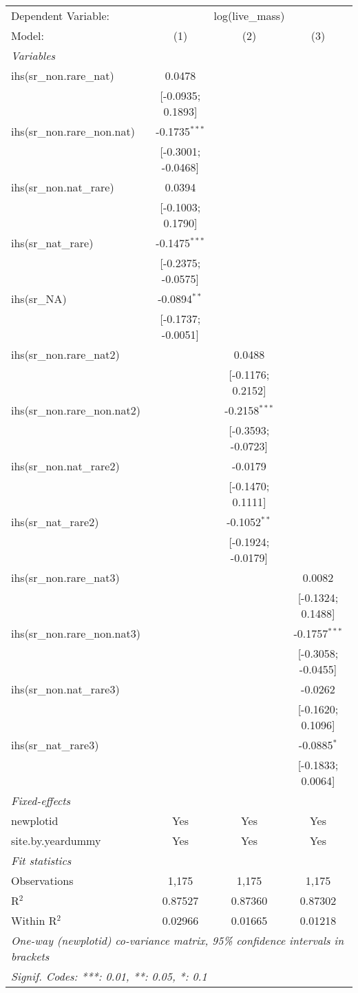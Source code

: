 \begin{tabular}{lccc}
\tabularnewline\midrule\midrule
Dependent Variable:&\multicolumn{3}{c}{log(live\_mass)}\\
Model:&(1) & (2) & (3)\\
\midrule \emph{Variables}&   &   &  \\
ihs(sr\_non.rare\_nat)&0.0478 &    &   \\
  &[-0.0935; 0.1893] &    &   \\
ihs(sr\_non.rare\_non.nat)&-0.1735$^{***}$ &    &   \\
  &[-0.3001; -0.0468] &    &   \\
ihs(sr\_non.nat\_rare)&0.0394 &    &   \\
  &[-0.1003; 0.1790] &    &   \\
ihs(sr\_nat\_rare)&-0.1475$^{***}$ &    &   \\
  &[-0.2375; -0.0575] &    &   \\
ihs(sr\_NA)&-0.0894$^{**}$ &    &   \\
  &[-0.1737; -0.0051] &    &   \\
ihs(sr\_non.rare\_nat2)&   & 0.0488 &   \\
  &   & [-0.1176; 0.2152] &   \\
ihs(sr\_non.rare\_non.nat2)&   & -0.2158$^{***}$ &   \\
  &   & [-0.3593; -0.0723] &   \\
ihs(sr\_non.nat\_rare2)&   & -0.0179 &   \\
  &   & [-0.1470; 0.1111] &   \\
ihs(sr\_nat\_rare2)&   & -0.1052$^{**}$ &   \\
  &   & [-0.1924; -0.0179] &   \\
ihs(sr\_non.rare\_nat3)&   &    & 0.0082\\
  &   &    & [-0.1324; 0.1488]\\
ihs(sr\_non.rare\_non.nat3)&   &    & -0.1757$^{***}$\\
  &   &    & [-0.3058; -0.0455]\\
ihs(sr\_non.nat\_rare3)&   &    & -0.0262\\
  &   &    & [-0.1620; 0.1096]\\
ihs(sr\_nat\_rare3)&   &    & -0.0885$^{*}$\\
  &   &    & [-0.1833; 0.0064]\\
\midrule \emph{Fixed-effects}&   &   &  \\
newplotid & Yes & Yes & Yes\\
site.by.yeardummy & Yes & Yes & Yes\\
\midrule \emph{Fit statistics}&  & & \\
Observations & 1,175&1,175&1,175\\
R$^2$ & 0.87527&0.87360&0.87302\\
Within R$^2$ & 0.02966&0.01665&0.01218\\
\midrule\midrule\multicolumn{4}{l}{\emph{One-way (newplotid) co-variance matrix, 95\% confidence intervals in brackets}}\\
\multicolumn{4}{l}{\emph{Signif. Codes: ***: 0.01, **: 0.05, *: 0.1}}\\
\end{tabular}


